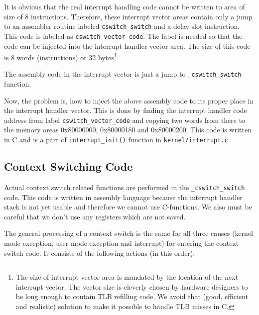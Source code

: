 \documentclass[twoside,a4paper]{report}
\begin{document}
It is obvious that the real interrupt handling code cannot be written
to area of size of 8 instructions. Therefore, these interrupt vector
areas contain only a jump to an assembler routine labeled
\texttt{cswitch\_switch} and a delay slot instruction. This code is
labeled as \texttt{cswitch\_vector\_code}. The label is needed so that
the code can be injected into the interrupt handler vector area. The
size of this code is 8 words (instructions) or 32 bytes\footnote{The
size of interrupt vector area is mandated by the location of the next
interrupt vector. The vector size is cleverly chosen by hardware
designers to be long enough to contain TLB refilling code. We avoid
that (good, efficient and realistic) solution to make it possible to
handle TLB misses in C.}.

The assembly code in the interrupt vector is just a jump to
\texttt{\_cswitch\_switch}-function.

Now, the problem is, how to inject the above assembly code to its
proper place in the interrupt handler vector. This is done by finding
the interrupt handler code address from label
\texttt{cswitch\_vector\_code} and copying two words from there to the
memory areas 0x80000000, 0x80000180 and 0x80000200. This code is
written in C and is a part of \texttt{interrupt\_init()} function in
\texttt{kernel/interrupt.c}.

\subsection{Context Switching Code}

Actual context switch related functions are performed in the
\texttt{\_cswitch\_switch} code. This code is written in assembly
language because the interrupt handler stack is not yet usable and
therefore we cannot use C-functions. We also must be careful that we
don't use any registers which are not saved.

The general processing of a context switch is the same for all three
causes (kernel mode exception, user mode exception and interrupt) for
entering the context switch code. It consists of the following actions
(in this order):
\end{document}
